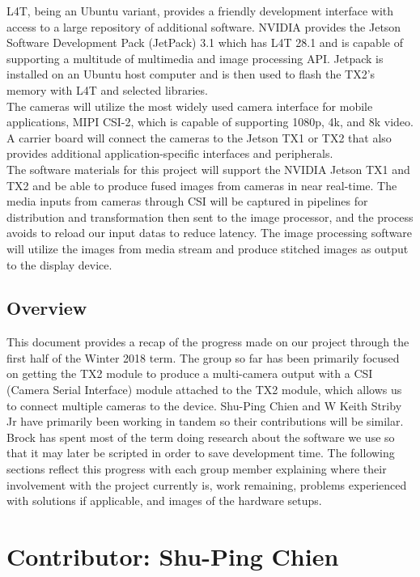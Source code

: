 \documentclass[letterpaper,10pt,serif,draftclsnofoot,onecolumn,compsoc,titlepage]{IEEEtran}
\begin{document}
L4T, being an Ubuntu variant, provides a friendly development interface with access to a 
large repository of additional software.
NVIDIA provides the Jetson Software Development Pack (JetPack) 3.1 which has L4T 28.1 
and is capable of supporting a multitude of multimedia and image processing API. Jetpack 
is installed on an Ubuntu host computer and is then used to flash the TX2's memory with L4T and 
selected libraries. \\

The cameras will utilize the most widely used camera interface for mobile applications, 
MIPI CSI-2, which is capable of supporting 1080p, 4k, and 8k video. 
A carrier board will connect the cameras to the Jetson TX1 or TX2 that also provides 
additional application-specific interfaces and peripherals. \\

The software materials for this project will support the NVIDIA Jetson TX1 and TX2 and 
be able to produce fused images from cameras in near real-time. The media inputs from 
cameras through CSI will be captured in pipelines for distribution and transformation 
then sent to the image processor, and the process avoids to reload our input datas to 
reduce latency. The image processing software will utilize the images from media stream 
and produce stitched images as output to the display device.  \\

\subsection{Overview}
This document provides a recap of the progress made on our project through the first half
of the Winter 2018 term. The group so far has been primarily focused on getting the TX2 module to produce a multi-camera output with a CSI (Camera Serial Interface) module attached to the TX2 module, which allows us to connect multiple cameras to the device.
Shu-Ping Chien and W Keith Striby Jr have primarily been working in tandem so their 
contributions will be similar. Brock has spent most of the term doing research about the software we use so that it may later be scripted in order to save development time. The following 
sections reflect this progress with each group member explaining where their involvement 
with the project currently is, work remaining, problems experienced 
with solutions if applicable, and images of the hardware setups. \\ 


\section{Contributor: Shu-Ping Chien}
\end{document}

